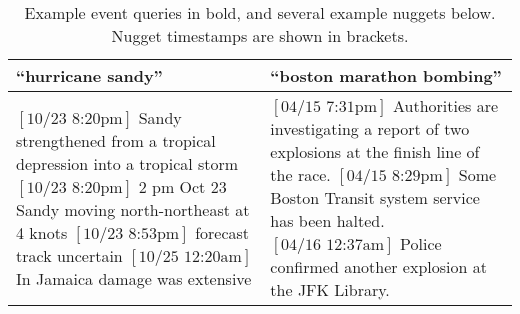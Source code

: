 \begin{table}
    \begin{tabular}{p{7.5cm}|p{7.5cm}}
         \textbf{``hurricane sandy''} &\textbf{``boston marathon bombing''} \\
        \hline
        \parbox{7.4cm}{\small
    $[\textrm{10/23 8:20pm}]$ Sandy strengthened from a tropical depression 
    into a tropical storm \\
    $[\textrm{10/23 8:20pm}]$ 2 pm Oct 23 Sandy moving north-northeast at 4 
    knots \\
    $[\textrm{10/23 8:53pm}]$ forecast track uncertain \\
    $[\textrm{10/25 12:20am}]$ In Jamaica damage was extensive
} & \parbox{7.4cm}{ \small
    $[\textrm{04/15 7:31pm}]$ Authorities are investigating a report of two 
    explosions at the finish line of the race. \\
    $[\textrm{04/15 8:29pm}]$ Some Boston Transit system service has been 
    halted.\\
    $[\textrm{04/16 12:37am}]$ Police confirmed another explosion at the JFK
    Library.
}
\end{tabular}
    \caption{Example event queries in bold, and several example nuggets below.
    Nugget timestamps are shown in brackets.}
    \label{fig:eventsnuggets}
\end{table}


